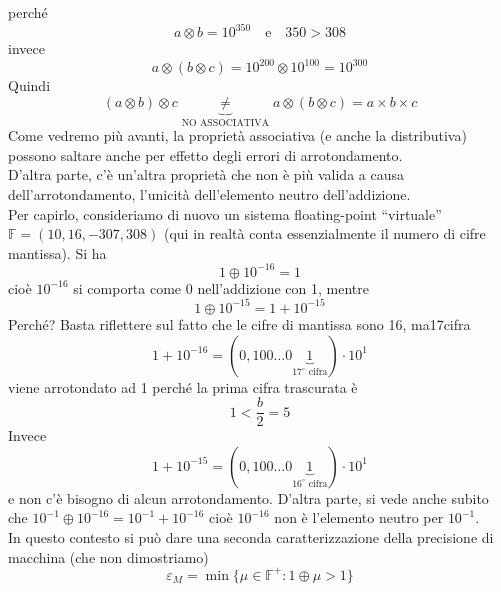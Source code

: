 perché  \[a \otimes b = 10^{350} \quad \text{e} \quad 350 >308\]
invece \[ a \otimes (b \otimes c) = 10^{200} \otimes 10^{100} = 10^{300} \]
Quindi \[ (a \otimes b) \otimes c \underbrace{\ne}_{\text{NO ASSOCIATIVA}} a \otimes (b \otimes c) = a \times b \times c \]
\newline \newline
Come vedremo più avanti, la proprietà associativa (e anche la distributiva) possono saltare anche per effetto degli errori di arrotondamento.\\
D'altra parte, c'è un'altra proprietà che non è più valida a causa dell'arrotondamento, l'unicità dell'elemento neutro dell'addizione.\\
Per capirlo, consideriamo di nuovo un sistema floating-point “virtuale” $\mathbb{F} = (10, 16, -307, 308)$ (qui in realtà conta essenzialmente il numero di cifre mantissa). Si ha 
\[ 1 \oplus 10^{-16} = 1\]
cioè $10^{-16}$ si comporta come 0 nell'addizione con 1, mentre 
\[ 1 \oplus 10^{-15} = 1 + 10^{-15}\]
Perché? Basta riflettere sul fatto che le cifre di mantissa sono 16, ma17cifra
\[ 1 + 10^{-16} = (0,100 \dotsc 0 \underbrace{1}_{17^\circ\text{ cifra}}) \cdot 10^1\]
viene arrotondato ad 1 perché la prima cifra trascurata è \[ 1 < \frac{b}{2} = 5 \]
Invece \[ 1 + 10^{-15} = (0,100 \dotsc 0 \underbrace{1}_{16^\circ\text{ cifra}}) \cdot 10^1\] 
e non c'è bisogno di alcun arrotondamento.
D'altra parte, si vede anche subito che $ 10^{-1} \oplus 10^{-16} = 10^{-1} + 10^{-16} $ cioè $10^{-16}$ non è l'elemento neutro per $10^{-1}$.\\
In questo contesto si può dare una seconda caratterizzazione della precisione di macchina (che non dimostriamo)
\[ \varepsilon_M = \min \{\mu \in \mathbb{F}^+ : 1 \oplus \mu > 1\} \]

